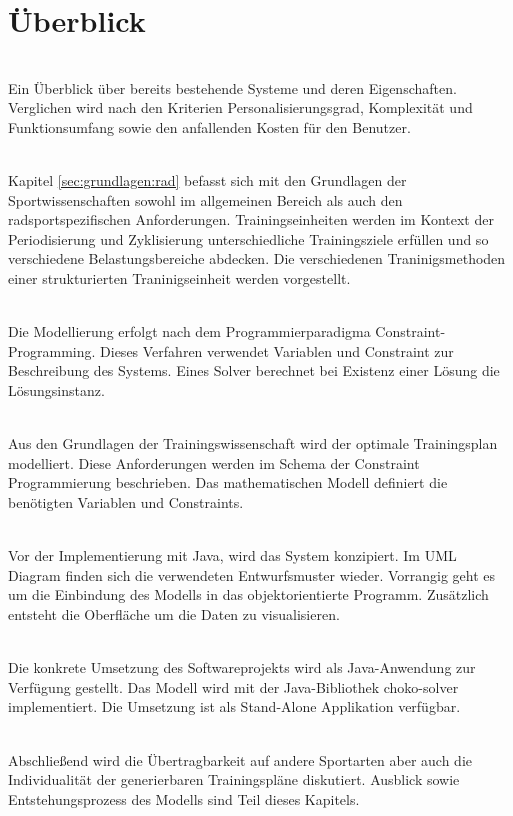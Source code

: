 \section{Überblick}
\label{sec:intro:ueberblick}
\textbf{} \\[0.2em]
Ein Überblick über bereits bestehende Systeme und deren Eigenschaften. Verglichen wird nach den Kriterien Personalisierungsgrad, Komplexität und Funktionsumfang sowie den anfallenden Kosten für den Benutzer.

\textbf{} \\[0.2em]
Kapitel \ref{sec:grundlagen:rad} befasst sich mit den Grundlagen der Sportwissenschaften sowohl im allgemeinen Bereich als auch den radsportspezifischen Anforderungen. Trainingseinheiten werden im Kontext der Periodisierung und Zyklisierung unterschiedliche Trainingsziele erfüllen und so verschiedene Belastungsbereiche abdecken. Die verschiedenen Traninigsmethoden einer strukturierten Traninigseinheit werden vorgestellt.

\textbf{} \\[0.2em]
Die Modellierung erfolgt nach dem Programmierparadigma Constraint-Programming. Dieses Verfahren verwendet Variablen und Constraint zur Beschreibung des Systems. Eines Solver berechnet bei Existenz einer Lösung die Lösungsinstanz. 

\textbf{} \\[0.2em]
Aus den Grundlagen der Trainingswissenschaft wird der optimale Trainingsplan modelliert. Diese Anforderungen werden im Schema der Constraint Programmierung beschrieben. Das mathematischen Modell definiert die benötigten Variablen und Constraints.

\textbf{} \\[0.2em]
Vor der Implementierung mit Java, wird das System konzipiert. Im UML Diagram finden sich die verwendeten Entwurfsmuster wieder. Vorrangig geht es um die Einbindung des Modells in das objektorientierte Programm. Zusätzlich entsteht die Oberfläche um die Daten zu visualisieren. 

\textbf{} \\[0.2em]
Die konkrete Umsetzung des Softwareprojekts wird als Java-Anwendung zur Verfügung gestellt. Das Modell wird mit der Java-Bibliothek choko-solver implementiert. Die Umsetzung ist als Stand-Alone Applikation verfügbar. 

\textbf{} \\[0.2em]
Abschließend wird die Übertragbarkeit auf andere Sportarten aber auch die Individualität der generierbaren Trainingspläne diskutiert. 
Ausblick sowie Entstehungsprozess des Modells sind Teil dieses Kapitels. 